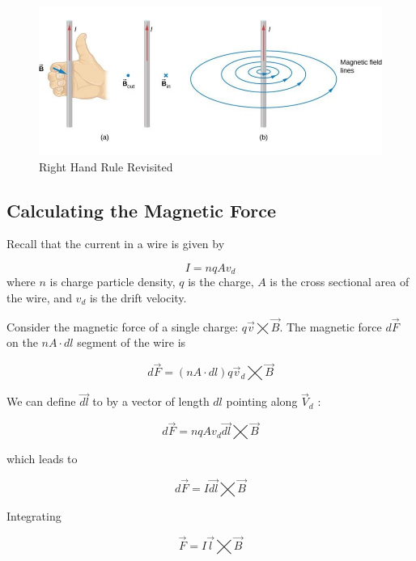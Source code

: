 \documentclass[14pt]{memoir}
\begin{document}
\begin{figure}[H]
\begin{center}
\includegraphics[scale=0.70]{fig/fig_11_11.jpg}
\caption{Right Hand Rule Revisited}
\label{fig:11_11}
\end{center}
\end{figure}

\subsection{Calculating the Magnetic Force}

Recall that the current in a wire is given by

\begin{equation}
I = n q A v_d
\end{equation}
where $n$ is charge particle density, $q$ is the charge, $A$ is the cross sectional area of the wire, and $v_d$ is the drift velocity. 

Consider the magnetic force of a single charge: $q \vec{v} \bigtimes \vec{B}$. The magnetic force $d\vec{F}$ on the $nA \cdot dl$ segment of the wire is

\begin{equation}
d\vec{F} = (nA \cdot dl)q \vec{v}_d \bigtimes \vec{B}
\end{equation}

We can define $\vec{dl}$ to by a vector of length $dl$ pointing along $\vec{V}_d$ :


\begin{equation}
d\vec{F} = nqAv_d \vec{dl} \bigtimes \vec{B}
\end{equation}

which leads to

\begin{equation}
d\vec{F} = I \vec{dl} \bigtimes \vec{B}
\end{equation}

Integrating

\begin{equation}
\vec{F} = I \vec{l} \bigtimes \vec{B}
\end{equation}
\end{document}

